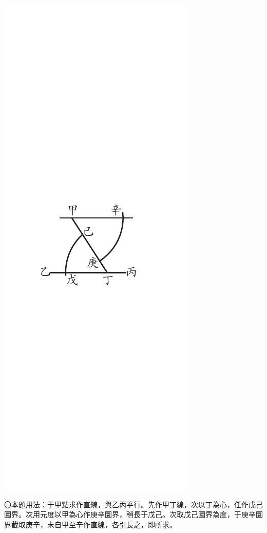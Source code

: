 \documentclass[12pt,b5paper,landscape]{article}
\newcommand{\bcom}[1]{〇#1}
\begin{document}
\begin{multicols}{2}
\begin{center}
      \includegraphics[angle=90]{eu79}
\end{center}
\bcom{本題用法：于甲點求作直線，與乙丙平行。先作甲丁線，次以丁為心，任作戊己圜界。次用元度以甲為心作庚辛圜界，稍長于戊己。次取戊己圜界為度，于庚辛圜界截取庚辛，末自甲至辛作直線，各引長之，即所求。}
\begin{center}

\end{center}
\end{multicols}
\end{document}
